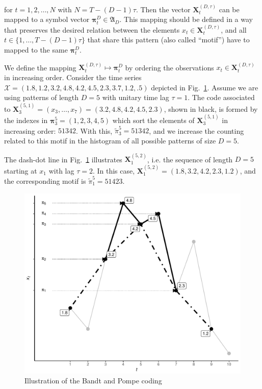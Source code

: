 \documentclass[paper=letter, fontsize=12pt]{article}
\begin{document}
for $t = 1,2,\dots,N$ with $N = T-(D-1) \tau$.
Then the vector ${\mathbf X}^{(D,\tau)}_t$ can be mapped to a symbol vector ${\bm \pi}_t^D \in {\mathfrak A}_{D}$. 
This mapping should be defined in a way that preserves the desired relation between the elements 
$x_t  \in {\mathbf X}^{(D,\tau)}_t$, and all $t \in \{1,\dots,T-(D-1)\tau\}$ that share this pattern (also called ``motif'') have to mapped to the same 
${\bm \pi}_t^{D}$.

We define the mapping ${\mathbf X}_t^{(D,\tau)} \mapsto {\mathbf \pi}_t^{D}$ by ordering the observations $x_t \in {\mathbf X}_t^{(D,\tau)}$ in increasing order.
Consider the time series $\mathcal X = (1.8, 1.2, 3.2, 4.8, 4.2, 4.5, 2.3, 3.7, 1.2, .5)$ depicted in Fig.~\ref{Fig:IntroBP}.
Assume we are using patterns of length $D=5$ with unitary time lag $\tau=1$.
The code associated to $\mathbf X_{3}^{(5,1)}=(x_3,\dots,x_7)=(3.2, 4.8, 4.2, 4.5, 2.3)$, shown in black, is formed by the indexes in $\bm\pi_3^{5}=(1,2,3,4,5)$ which sort the elements of $\mathbf X_{3}^{(5,1)}$ in increasing order: $51342$.
With this, $\widetilde{\pi}_3^{5} = 51342$, and we increase the counting related to this motif in the histogram of all possible patterns of size $D=5$.

The dash-dot line in Fig.~\ref{Fig:IntroBP} illustrates $\mathbf X_{1}^{(5,2)}$, i.e. the sequence of length $D=5$ starting at $x_1$ with lag $\tau=2$.
In this case, $\mathbf X_{1}^{(5,2)}= (1.8, 3.2, 4.2, 2.3, 1.2)$, and the corresponding motif is $\widetilde{\pi}_1^{5}=51423$.

\begin{figure}[hbt]
	\centering
	\includegraphics[width=.8\linewidth]{Figures/IntroBP}
	\caption{Illustration of the Bandt and Pompe coding\label{Fig:IntroBP}}
\end{figure}
\end{document}
